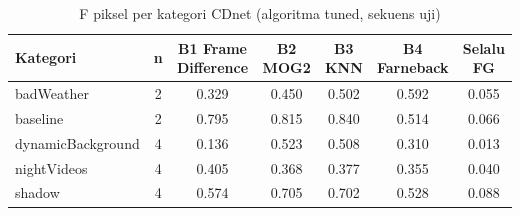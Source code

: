 \begin{table}[t]
\centering
\caption{F piksel per kategori CDnet (algoritma tuned, sekuens uji)}
\label{tab:table_by_category}
\begin{tabular}{lcccccc}
\toprule
Kategori & n & B1 Frame Difference & B2 MOG2 & B3 KNN & B4 Farneback & Selalu FG \\
\midrule
badWeather & 2 & 0.329 & 0.450 & 0.502 & 0.592 & 0.055 \\
baseline & 2 & 0.795 & 0.815 & 0.840 & 0.514 & 0.066 \\
dynamicBackground & 4 & 0.136 & 0.523 & 0.508 & 0.310 & 0.013 \\
nightVideos & 4 & 0.405 & 0.368 & 0.377 & 0.355 & 0.040 \\
shadow & 4 & 0.574 & 0.705 & 0.702 & 0.528 & 0.088 \\
\bottomrule
\end{tabular}
\end{table}
